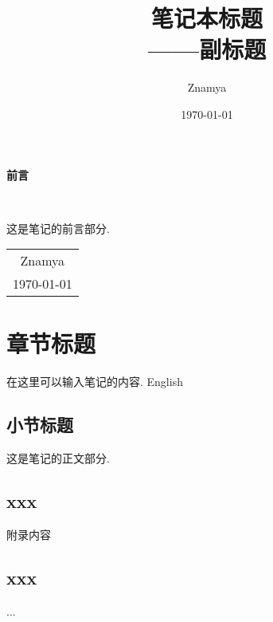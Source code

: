 \documentclass[12pt, a4paper, oneside]{ctexbook}
\title{{\Huge{\textbf{笔记本标题}}}\\——副标题}
\author{Znamya}
\date{\today}
\begin{document}
\maketitle

\setcounter{page}{1}

\begin{center}
    \Huge\textbf{前言}
\end{center}~\

这是笔记的前言部分. 
~\\
\begin{flushright}
    \begin{tabular}{c}
        Znamya\\
        \today
    \end{tabular}
\end{flushright}

\newpage
{}
\setcounter{page}{1}
\tableofcontents
\newpage
\setcounter{page}{1}

\chapter{章节标题}

在这里可以输入笔记的内容. English


\section{小节标题}

这是笔记的正文部分. 






\begin{appendices}
\section{xxx}
附录内容
\section{xxx}
...
\end{appendices}
\end{document}
